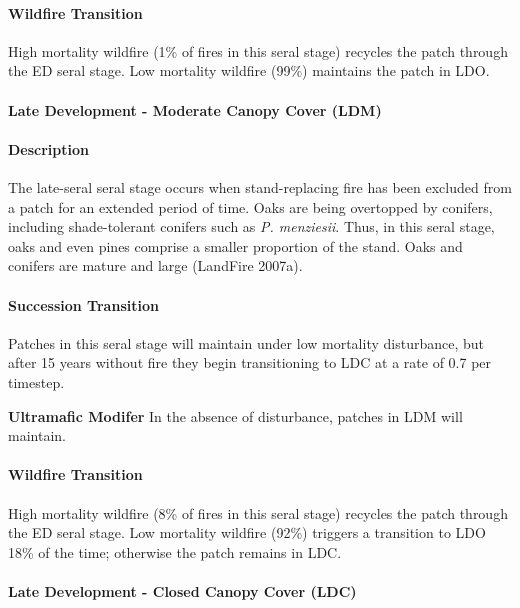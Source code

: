 \paragraph{Wildfire Transition}
High mortality wildfire (1\% of fires in this seral stage) recycles the patch through the ED seral stage. Low mortality wildfire (99\%) maintains the patch in LDO.

\noindent\hrulefill

\paragraph{Late Development - Moderate Canopy Cover (LDM)}

\paragraph{Description} The late-seral seral stage occurs when stand-replacing fire has been excluded from a patch for an extended period of time. Oaks are being overtopped by conifers, including shade-tolerant conifers such as \emph{P. menziesii}. Thus, in this seral stage, oaks and even pines comprise a smaller proportion of the stand. Oaks and conifers are mature and large (LandFire 2007a). 

\paragraph{Succession Transition} Patches in this seral stage will maintain under low mortality disturbance, but after 15 years without fire they begin transitioning to LDC at a rate of 0.7 per timestep.
\begin{adjustwidth}{2cm}{}

\textbf{Ultramafic Modifer}  In the absence of disturbance, patches in LDM will maintain.

\end{adjustwidth}
\paragraph{Wildfire Transition} High mortality wildfire (8\% of fires in this seral stage) recycles the patch through the ED seral stage. Low mortality wildfire (92\%) triggers a transition to LDO 18\% of the time; otherwise the patch remains in LDC.

\noindent\hrulefill

\paragraph{Late Development - Closed Canopy Cover (LDC)}

